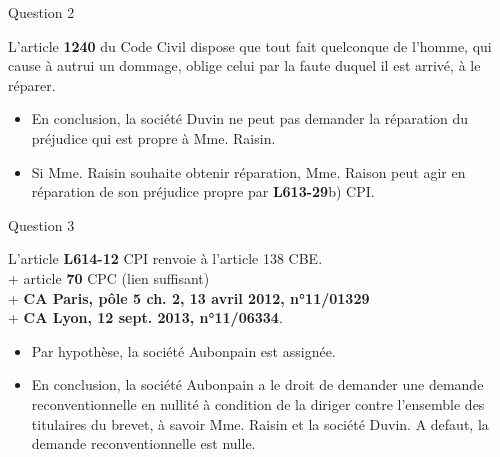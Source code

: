 \begin{frame}{Question 2}

\begin{block}{}
L'article \textbf{1240} du Code Civil dispose que
tout fait quelconque de l'homme, qui cause à autrui un dommage,
oblige celui par la faute duquel il est arrivé, à le réparer.
\end{block}

\begin{itemize}
  \item En conclusion, la société Duvin ne peut pas demander
  la réparation du préjudice qui est propre à Mme. Raisin.
  \item Si Mme. Raisin souhaite obtenir réparation,
  Mme. Raison peut agir en réparation de son préjudice propre
  par \textbf{L613-29}b) CPI.
\end{itemize}

\end{frame}

\begin{frame}{Question 3}

\begin{block}{}
L'article \textbf{L614-12} CPI renvoie à l'article 138 CBE.\\
+ article \textbf{70} CPC (lien suffisant)\\
+ \textbf{CA Paris, pôle 5 ch. 2, 13 avril 2012, n°11/01329}\\
+ \textbf{CA Lyon, 12 sept. 2013, n°11/06334}.\\
\end{block}

\begin{itemize}
    \item Par hypothèse, la société Aubonpain est assignée.
    \item En conclusion, la société Aubonpain a le droit de
    demander une demande reconventionnelle en nullité à condition
    de la diriger contre l'ensemble des titulaires du brevet,
    à savoir Mme. Raisin et la société Duvin. A defaut, la
    demande reconventionnelle est nulle.
\end{itemize}

\end{frame}


